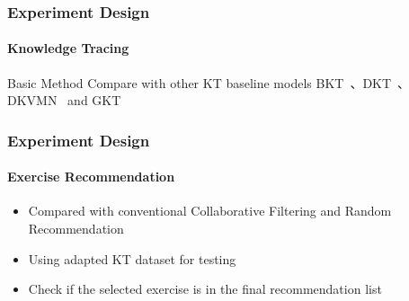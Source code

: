 \documentclass{beamer}
\begin{document}
\begin{frame}
  \frametitle{Experiment Design}
  \framesubtitle{Knowledge Tracing}
  \begin{block}{Basic Method}
    Compare with other KT baseline models BKT~\cite{yudelson2013individualized}、DKT~\cite{piech2015deep}、DKVMN~\cite{chen2017improving} and GKT~\cite{nakagawa2019graph}
  \end{block}
  \begin{table}[htbp!]
    \centering
    \caption{Dataset Statistics}\label{tbl:ch2-tb1}
  \end{table}
\end{frame}

\begin{frame}
  \frametitle{Experiment Design}
  \framesubtitle{Exercise Recommendation}
  \begin{itemize}
    \item Compared with conventional Collaborative Filtering and Random Recommendation
    \item Using adapted KT dataset for testing
    \item Check if the selected exercise is in the final recommendation list
  \end{itemize}
\end{frame}
\end{document}

